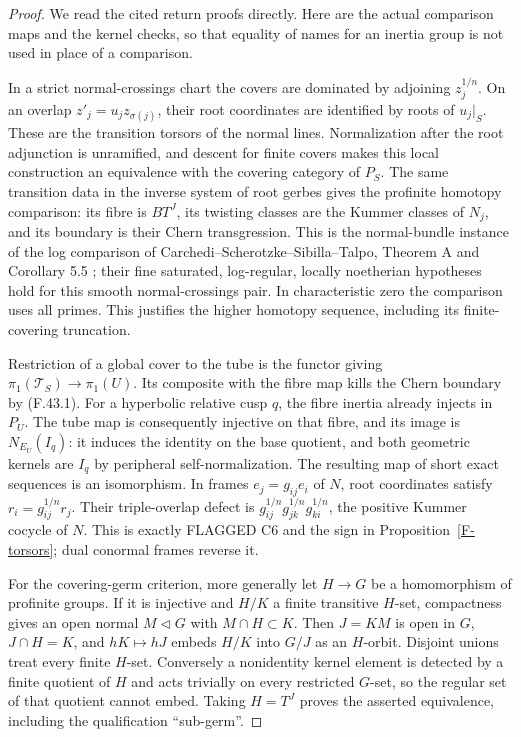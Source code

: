 \begin{proof}
We read the cited return proofs directly. Here are the actual
comparison maps and the kernel checks, so that equality of names
for an inertia group is not used in place of a comparison.

In a strict normal-crossings chart the covers are dominated by
adjoining $z_j^{1/n}$. On an overlap
$z'_j=u_jz_{\sigma(j)}$, their root coordinates are identified by
roots of $u_j|_S$. These are the transition torsors of the normal
lines. Normalization after the root adjunction is unramified,
and descent for finite covers makes this local construction an
equivalence with the covering category of $P_S$. The same
transition data in the inverse system of root gerbes gives the
profinite homotopy comparison: its fibre is $BT^J$, its twisting
classes are the Kummer classes of $N_j$, and its boundary is
their Chern transgression. This is the normal-bundle instance
of the log comparison of Carchedi--Scherotzke--Sibilla--Talpo,
Theorem A and Corollary 5.5 \cite{F-CSST}; their fine saturated,
log-regular, locally noetherian hypotheses hold for this smooth
normal-crossings pair. In characteristic zero the comparison
uses all primes. This justifies the higher homotopy sequence,
including its finite-covering truncation.

Restriction of a global cover to the tube is the functor
giving $\pi_1(\mathcal T_S)\to\pi_1(U)$. Its composite with
the fibre map kills the Chern boundary by (F.43.1).
For a hyperbolic relative cusp $q$, the fibre inertia already
injects in $P_U$. The tube map is consequently injective on
that fibre, and its image is $N_{E_U}(I_q)$: it induces the
identity on the base quotient, and both geometric kernels
are $I_q$ by peripheral self-normalization. The resulting
map of short exact sequences is an isomorphism. In frames
$e_j=g_{ij}e_i$ of $N$, root coordinates satisfy
$r_i=g_{ij}^{1/n}r_j$. Their triple-overlap defect is
$g_{ij}^{1/n}g_{jk}^{1/n}g_{ki}^{1/n}$, the positive Kummer
cocycle of $N$. This is exactly FLAGGED C6 and the sign in
Proposition~\ref{F-torsors}; dual conormal frames reverse it.

For the covering-germ criterion, more generally let
$H\to G$ be a homomorphism of profinite groups. If it is
injective and $H/K$ a finite transitive $H$-set, compactness
gives an open normal $M\lhd G$ with $M\cap H\subset K$.
Then $J=KM$ is open in $G$, $J\cap H=K$, and
$hK\mapsto hJ$ embeds $H/K$ into $G/J$ as an $H$-orbit.
Disjoint unions treat every finite $H$-set. Conversely a
nonidentity kernel element is detected by a finite quotient
of $H$ and acts trivially on every restricted $G$-set, so
the regular set of that quotient cannot embed. Taking
$H=T^J$ proves the asserted equivalence, including the
qualification ``sub-germ''.


\end{proof}
